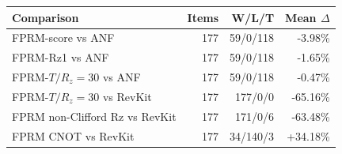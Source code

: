 \begin{tabular}{lrrr}
\toprule
Comparison & Items & W/L/T & Mean $\Delta$ \\
\midrule
FPRM-score vs ANF & 177 & 59/0/118 & -3.98\% \\
FPRM-Rz1 vs ANF & 177 & 59/0/118 & -1.65\% \\
FPRM-$T/R_z=30$ vs ANF & 177 & 59/0/118 & -0.47\% \\
FPRM-$T/R_z=30$ vs RevKit & 177 & 177/0/0 & -65.16\% \\
FPRM non-Clifford Rz vs RevKit & 177 & 171/0/6 & -63.48\% \\
FPRM CNOT vs RevKit & 177 & 34/140/3 & +34.18\% \\
\bottomrule
\end{tabular}
